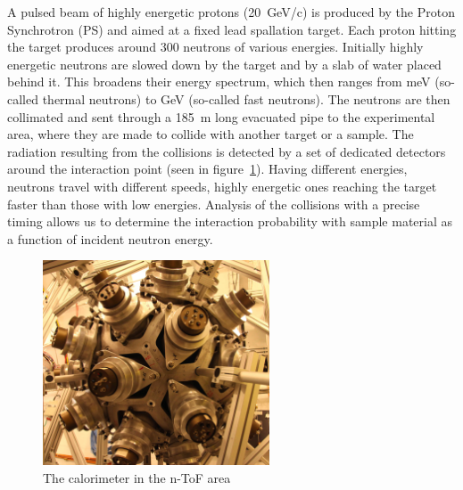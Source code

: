 \documentclass[twoside,12pt]{packages/mytustyle}  %
\begin{document}
A pulsed beam of highly energetic protons (20~GeV/c) is produced by the Proton Synchrotron (PS) and aimed at a fixed lead spallation target. Each proton hitting the target produces around 300 neutrons of various energies. Initially highly energetic neutrons are slowed down by the target and by a slab of water placed behind it. This broadens their energy spectrum, which then ranges from meV (so-called thermal neutrons) to GeV (so-called fast neutrons). The neutrons are then collimated and sent through a 185~m long evacuated pipe to the experimental area, where they are made to collide with another target or a sample. The radiation resulting from the collisions is detected by a set of dedicated detectors around the interaction point (seen in figure~\ref{fig:ntof}). Having different energies, neutrons travel with different speeds, highly energetic ones reaching the target faster than those with low energies. Analysis of the collisions with a precise timing allows us to determine the interaction probability with sample material as a function of incident neutron energy.
\begin{figure}[!t]
\centering
\includegraphics[width=0.6\textwidth]{pics/ntof}
\caption{The calorimeter in the n-ToF area \cite{Maximilien:1304589}}
\label{fig:ntof}
\end{figure}


\end{document}
